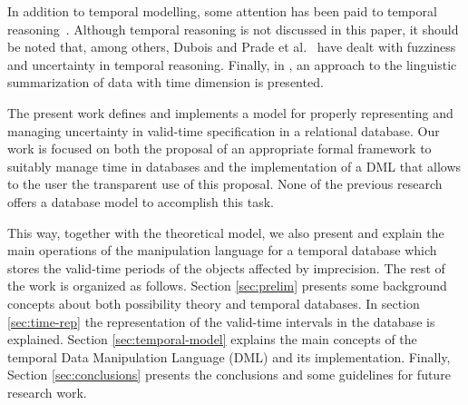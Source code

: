 
In addition to temporal modelling, some attention has been paid to temporal reasoning~\cite{Allen1983}. Although temporal reasoning is not discussed in this paper, it should be noted that, among others, Dubois and Prade et al.~\cite{Dubois2003,DuBois1989} have dealt with fuzziness and uncertainty in temporal reasoning. Finally, in \cite{rita1,rita2}, an approach to the linguistic summarization of data with time dimension is presented.

The present work defines and implements a model for properly representing and managing uncertainty in valid-time specification in a relational database. Our work is focused on both the proposal of an appropriate formal framework to suitably manage time in databases and the implementation of a DML that allows to the user the transparent use of this proposal. None of the previous research offers a database model to accomplish this task.

This way, together with the theoretical model, we also present and explain the main operations of the manipulation language for a temporal database which stores the valid-time periods of the objects affected by imprecision. The rest of the work is organized as follows. Section \ref{sec:prelim} presents some background concepts about both possibility theory and temporal databases. In section \ref{sec:time-rep} the representation of the valid-time intervals in the database is explained. Section \ref{sec:temporal-model} explains the main concepts of the temporal Data Manipulation Language (DML) and its implementation. Finally, Section \ref{sec:conclusions} presents the conclusions and some guidelines for future research work.


